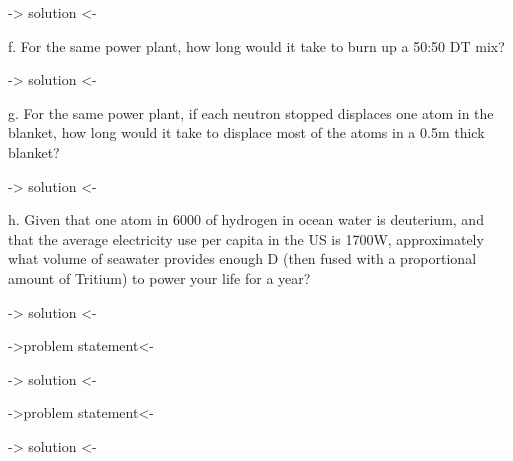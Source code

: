 \documentclass[12pt]{article}
\newenvironment{problem}[2][Problem]
{
	\begin{trivlist} 
		\item[\hskip \labelsep {\bfseries #1 #2:}]
	}
{
	\end{trivlist}
	}
\newenvironment{solution}[1][Solution]
{
	\begin{trivlist} 
		\item[\hskip \labelsep {\itshape #1:}]
	}
	{
	\end{trivlist}
}
\begin{document}
\begin{problem}{1}
\begin{solution}
-> solution <-
\end{solution}
\noindent
\newline
\newline
f. For the same power plant, how long would it take to burn up a 50:50 DT mix?
\begin{solution}
-> solution <-
\end{solution}
\noindent
\newline
\newline
g. For the same power plant, if each neutron stopped displaces one atom in the blanket, how long would it take to displace most of the atoms in a 0.5m thick blanket?
\begin{solution}
-> solution <-
\end{solution}
\noindent
\newline
\newline
h. Given that one atom in 6000 of hydrogen in ocean water is deuterium, and that the average electricity use per capita in the US is 1700W, approximately what volume of seawater provides enough D (then fused with a proportional amount of Tritium) to power your life for a year?
\begin{solution}
-> solution <-
\end{solution}

\end{problem}






\newpage
\begin{problem}{2}
->problem statement<-
\noindent
\newline
\newline
\begin{solution}
-> solution <-
\end{solution}
\end{problem}






\newpage
\begin{problem}{3}
->problem statement<-
\noindent
\newline
\newline
\begin{solution}
-> solution <-
\end{solution}
\end{problem}
\end{document}
